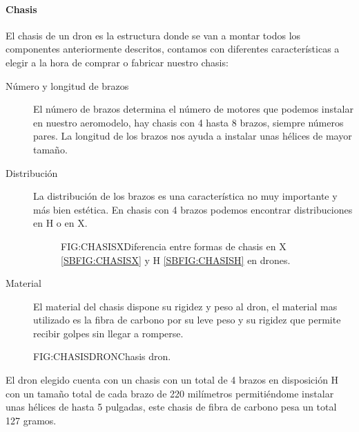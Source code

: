 
\paragraph{Chasis}
\label{SSS:Chasis}

	El chasis de un dron es la estructura donde se van a montar todos los componentes anteriormente descritos, contamos con diferentes características a elegir a la hora de comprar o fabricar nuestro chasis:
	
	\begin{description}
	\item[Número y longitud de brazos] El número de brazos determina el número de motores que podemos instalar en nuestro aeromodelo, hay chasis con 4 hasta 8 brazos, siempre números pares.
	La longitud de los brazos nos ayuda a instalar unas hélices de mayor tamaño.
	\item[Distribución] La distribución de los brazos es una característica no muy importante y más bien estética. En chasis con 4 brazos podemos encontrar distribuciones en H o en X.
	\begin{figure}[Chasis dron en X y H]{FIG:CHASISX}{Diferencia entre formas de chasis en X \ref{SBFIG:CHASISX} y H \ref{SBFIG:CHASISH} en drones.}
	
   \quad
  
\end{figure} 
	\item[Material] El material del chasis dispone su rigidez y peso al dron, el material mas utilizado es la fibra de carbono por su leve peso y su rigidez que permite recibir golpes sin llegar a romperse.
	\end{description}
	
	\begin{figure}[Chasis dron]{FIG:CHASISDRON}{Chasis dron.}
\end{figure}	
		
	El dron elegido cuenta con un chasis con un total de 4 brazos en disposición H con un tamaño total de cada brazo de 220 milímetros permitiéndome instalar unas hélices de hasta 5 pulgadas, este chasis de fibra de carbono pesa un total 127 gramos.
	
